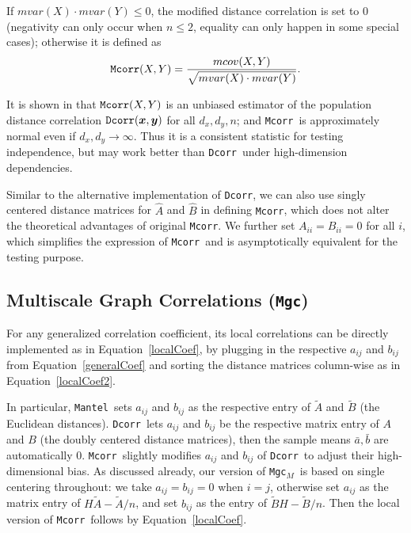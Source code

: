 \documentclass[11pt]{article}
\providecommand{\sct}[1]{{\sc \texttt{#1}}}
\providecommand{\mb}[1]{\boldsymbol{#1}}
\newcommand{\Mgc}{\sct{Mgc}}
\newcommand{\Mgcm}{\sct{Mgc$_M$}}
\newcommand{\Dcorr}{\sct{Dcorr}}
\newcommand{\Mcorr}{\sct{Mcorr}}
\newcommand{\Mantel}{\sct{Mantel}}
\begin{document}
If $mvar(X) \cdot mvar(Y) \leq 0$, the modified distance correlation is set to $0$ (negativity can only occur when $n\leq 2$, equality can only happen in some special cases); otherwise it is defined as
\begin{equation}
\label{mcorrEqu}
\Mcorr(X,Y)=\frac{mcov(X,Y)}{\sqrt{mvar(X) \cdot mvar(Y)}}.
\end{equation}

It is shown in \cite{SzekelyRizzo2013a} that $\Mcorr(X,Y)$ is an unbiased estimator of the population distance correlation $\Dcorr(\mb{x},\mb{y})$ for all $d_{x}, d_{y}, n$; and \Mcorr~is approximately normal even if $d_{x},d_{y} \rightarrow \infty$. Thus it is a consistent statistic for testing independence, but may work better than \Dcorr~under high-dimension dependencies.

Similar to the alternative implementation of \Dcorr, we can also use singly centered distance matrices for $\hat{A}$ and $\hat{B}$ in defining \Mcorr, which does not alter the theoretical advantages of original \Mcorr. We further set $A_{ii}=B_{ii}=0$ for all $i$, which simplifies the expression of \Mcorr~and is asymptotically equivalent for the testing purpose.


\subsection{Multiscale Graph Correlations (\Mgc)}
\label{appen:mgc}
For any generalized correlation coefficient, its local correlations can be directly implemented as in Equation~\ref{localCoef}, by plugging in the respective $a_{ij}$ and $b_{ij}$ from Equation~\ref{generalCoef} and sorting the distance matrices column-wise as in Equation~\ref{localCoef2}.

In particular, \Mantel~sets $a_{ij}$ and $b_{ij}$ as the respective entry of $\tilde{A}$ and $\tilde{B}$ (the Euclidean distances). \Dcorr~lets $a_{ij}$ and $b_{ij}$ be the respective matrix entry of $A$ and $B$ (the doubly centered distance matrices), then the sample means $\bar{a}, \bar{b}$ are automatically $0$. \Mcorr~slightly modifies $a_{ij}$ and $b_{ij}$ of \Dcorr~to adjust their high-dimensional bias. As discussed already, our version of \Mgcm~is based on single centering throughout: we take $a_{ij}=b_{ij}=0$ when $i=j$, otherwise set $a_{ij}$ as the matrix entry of $H\tilde{A}-\tilde{A}/n$, and set $b_{ij}$ as the entry of $\tilde{B}H-\tilde{B}/n$. Then the local version of \Mcorr~follows by Equation~\ref{localCoef}.
\end{document}
